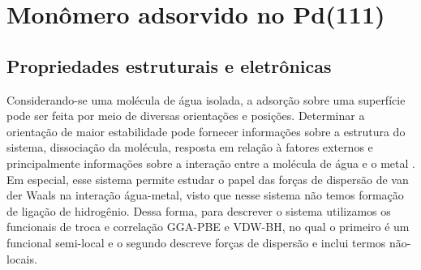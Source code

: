 \section{Monômero adsorvido no Pd(111) \label{sec:agua}}


\subsection*{Propriedades estruturais e eletrônicas}
Considerando-se uma molécula de água isolada, a adsorção sobre uma superfície pode ser feita por meio de diversas orientações e posições. Determinar a orientação de maior estabilidade pode fornecer informações sobre a estrutura do sistema, dissociação da molécula, resposta em relação à fatores externos e principalmente informações sobre a interação entre a molécula de água e o metal \cite{michaedelis}. Em especial, esse sistema permite estudar o papel das forças de dispersão de van der Waals na interação água-metal, visto que nesse sistema não temos formação de ligação de hidrogênio. Dessa forma, para descrever o sistema utilizamos os funcionais de troca e correlação GGA-PBE\cite{PBE} e VDW-BH\cite{vdw-bh}, no qual o primeiro  é um funcional semi-local e o segundo descreve forças de dispersão e inclui termos não-locais.



